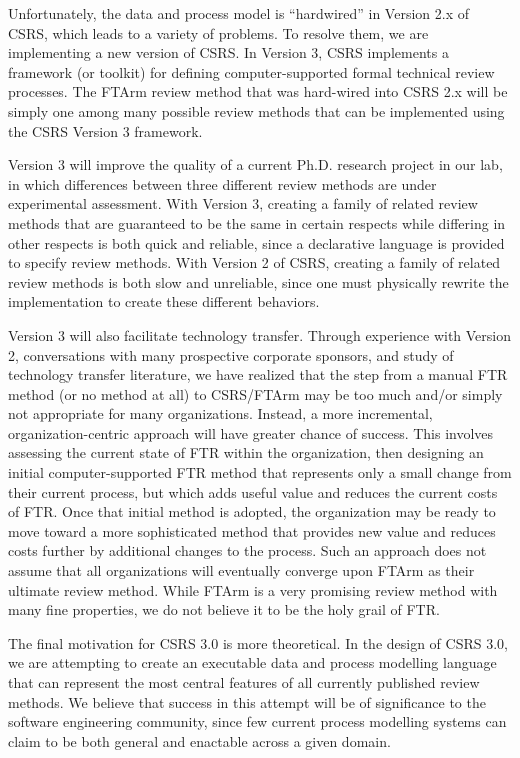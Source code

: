 Unfortunately, the data and process model is ``hardwired'' in Version 2.x
of CSRS, which leads to a variety of problems. To resolve them, we are
implementing a new version of CSRS.  In Version 3, CSRS implements a
framework (or toolkit) for defining computer-supported formal technical
review processes.  The FTArm review method that was hard-wired into CSRS
2.x will be simply one among many possible review methods that can be
implemented using the CSRS Version 3 framework.

Version 3 will improve the quality of a current Ph.D. research project in
our lab, in which differences between three different review methods are
under experimental assessment.  With Version 3, creating a family of
related review methods that are guaranteed to be the same in certain
respects while differing in other respects is both quick and reliable,
since a declarative language is provided to specify review methods.  With
Version 2 of CSRS, creating a family of related review methods is both slow
and unreliable, since one must physically rewrite the implementation to
create these different behaviors.

Version 3 will also facilitate technology transfer.  Through experience
with Version 2, conversations with many prospective corporate sponsors, and
study of technology transfer literature, we have realized that the step
from a manual FTR method (or no method at all) to CSRS/FTArm may be too
much and/or simply not appropriate for many organizations.  Instead, a more
incremental, organization-centric approach will have greater chance
of success.  This involves assessing the current state of FTR within the
organization, then designing an initial computer-supported FTR method that
represents only a small change from their current process, but which adds
useful value and reduces the current costs of FTR.  Once that initial
method is adopted, the organization may be ready to move toward a more
sophisticated method that provides new value and reduces costs further by
additional changes to the process. Such an approach does not assume that
all organizations will eventually converge upon FTArm as their ultimate
review method.  While FTArm is a very promising review method with many
fine properties, we do not believe it to be the holy grail of FTR.

The final motivation for CSRS 3.0 is more theoretical. In the design of
CSRS 3.0, we are attempting to create an executable data and process
modelling language that can represent the most central features of all
currently published review methods.  We believe that success in this
attempt will be of significance to the software engineering community,
since few current process modelling systems can claim to be both general
and enactable across a given domain.

